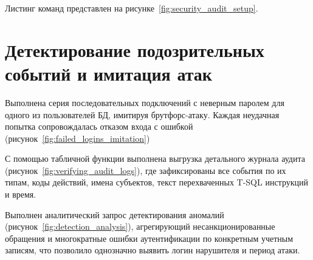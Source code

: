 Листинг команд представлен на рисунке~\ref{fig:security_audit_setup}.

\section{Детектирование подозрительных событий и имитация атак}

Выполнена серия последовательных подключений с неверным паролем для одного из пользователей БД, имитируя брутфорс-атаку.
Каждая неудачная попытка сопровождалась отказом входа с ошибкой (рисунок~\ref{fig:failed_logins_imitation})

С помощью табличной функции  выполнена выгрузка детального журнала аудита (рисунок~\ref{fig:verifying_audit_logs}), где зафиксированы все события по их типам, коды действий, имена субъектов, текст перехваченных T-SQL инструкций и время.

Выполнен аналитический запрос детектирования аномалий (рисунок~\ref{fig:detection_analysis}), агрегирующий несанкционированные обращения и многократные ошибки аутентификации по конкретным учетным записям, что позволило однозначно выявить логин нарушителя и период атаки.